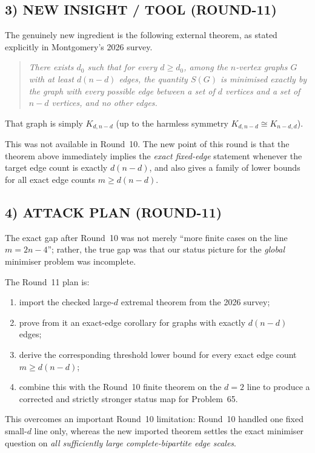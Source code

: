 \subsection*{3) NEW INSIGHT / TOOL (ROUND-11)}

The genuinely new ingredient is the following external theorem, as stated explicitly in Montgomery's 2026 survey.

\begin{quote}
\emph{There exists $d_0$ such that for every $d\ge d_0$, among the $n$-vertex graphs $G$ with at least $d(n-d)$ edges, the quantity $S(G)$ is minimised exactly by the graph with every possible edge between a set of $d$ vertices and a set of $n-d$ vertices, and no other edges.}
\end{quote}

That graph is simply $K_{d,n-d}$ (up to the harmless symmetry $K_{d,n-d}\cong K_{n-d,d}$).

This was not available in Round~10. The new point of this round is that the theorem above immediately implies the \emph{exact fixed-edge} statement whenever the target edge count is exactly $d(n-d)$, and also gives a family of lower bounds for all exact edge counts $m\ge d(n-d)$.

\subsection*{4) ATTACK PLAN (ROUND-11)}

The exact gap after Round~10 was not merely ``more finite cases on the line $m=2n-4$''; rather, the true gap was that our status picture for the \emph{global} minimiser problem was incomplete.

The Round~11 plan is:
\begin{enumerate}
\item import the checked large-$d$ extremal theorem from the 2026 survey;
\item prove from it an exact-edge corollary for graphs with exactly $d(n-d)$ edges;
\item derive the corresponding threshold lower bound for every exact edge count $m\ge d(n-d)$;
\item combine this with the Round~10 finite theorem on the $d=2$ line to produce a corrected and strictly stronger status map for Problem~65.
\end{enumerate}

This overcomes an important Round~10 limitation: Round~10 handled one fixed small-$d$ line only, whereas the new imported theorem settles the exact minimiser question on \emph{all sufficiently large complete-bipartite edge scales}.

